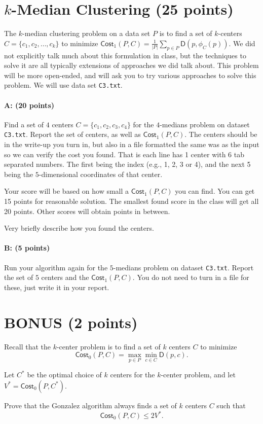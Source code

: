 \documentclass[11pt]{article}
\newcommand{\D}{\textsf{D}}
\begin{document}
\section{$k$-Median Clustering (25 points)}
The $k$-median clustering problem on a data set $P$ is to find a set of $k$-centers $C = \{c_1, c_2, \ldots, c_k\}$ to minimize
$
\textsf{Cost}_1(P,C) = \frac{1}{|P|}\sum_{p \in P} \D(p, \phi_C(p)).
$
We did not explicitly talk much about this formulation in class, but the techniques to solve it are all typically extensions of approaches we did talk about.  This problem will be more open-ended, and will ask you to try various approaches to solve this problem.  We will use data set \texttt{C3.txt}.  


\paragraph{A: (20 points)}
Find a set of $4$ centers $C = \{c_1, c_2, c_3, c_4\}$ for the $4$-medians problem on dataset \texttt{C3.txt}.  Report the set of centers, as well as $\textsf{Cost}_1(P,C)$.  The centers should be in the write-up you turn in, but also in a file formatted the same was as the input so we can verify the cost you found.  That is each line has 1 center with 6 tab separated numbers.  The first being the index (e.g., 1, 2, 3 or 4), and the next 5 being the $5$-dimensional coordinates of that center.  

Your score will be based on how small a $\textsf{Cost}_1(P,C)$ you can find.   You can get 15 points for reasonable solution.  The smallest found score in the class will get all 20 points.  Other scores will obtain points in between.  

Very briefly describe how you found the centers.  


\paragraph{B: (5 points)}
Run your algorithm again for the $5$-medians problem on dataset \texttt{C3.txt}.  Report the set of $5$ centers and the $\textsf{Cost}_1(P,C)$.  You do not need to turn in a file for these, just write it in your report.  




\section{BONUS (2 points)}

Recall that the $k$-center problem is to find a set of $k$ centers $C$ to minimize
\[
\textsf{Cost}_0(P,C) = \max_{p \in P} \min_{c \in C} \D(p, c).
\]

Let $C^*$ be the optimal choice of $k$ centers for the $k$-center problem, and let $V^* = \textsf{Cost}_0(P,C^*)$.  

Prove that the \textsf{Gonzalez} algorithm always finds a set of $k$ centers $C$ such that 
\[
\textsf{Cost}_0(P,C) \leq 2 V^*.
\]
\end{document}

